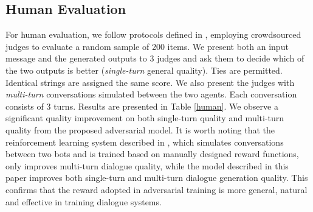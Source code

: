 \documentclass[11pt]{article}
\newcommand{\sts}{{{\textsc{Seq2Seq}}}\xspace}
\begin{document}
\begin{comment}
\subsection{N-choose-1 Metric}
We evaluate the model using an N-choose-1 ranking metric, as described in \newcite{shao15}. 
 In
the N-choose-1 evaluation, given dialogue history, we ask the generator to score N candidate responses, where one of the N candidate responses is the ground truth and the rest are random responses.
N-choose-1 accuracy is defined to be the fraction of test cases in which the trained model assigns the highest score to the ground truth.
We report 50-, 10-, and 2-choose-1 accuracy. Results are shown in Table \ref{choose}. 
Again we see a clear performance boost from the adversarial model over the
standard \sts variants.

\begin{table}
\small
\centering
\begin{tabular}{cccc}
\hline
Model&50&10&2\\\hline
\sts&0.087&0.28&0.73 \\
MMI&0.43&0.69&0.88\\
Adversarial&0.53&0.75&0.95\\\hline
\end{tabular}
\caption{N-choose-1 evaluation on different models.}
\label{choose}
\end{table}
\end{comment}

\subsection{Human Evaluation}
For human evaluation, we follow protocols defined in , employing
crowdsourced judges to evaluate a random sample of
200 items. We present both an input message and the
generated outputs to 3 judges and ask them to decide
which of the two outputs is better ({\it single-turn}
general quality). Ties are permitted. Identical
strings are assigned the same score. 
We also
 present the judges with {\it multi-turn}
conversations simulated between the two agents. Each conversation
consists of 3 turns.
Results are presented in Table \ref{human}.
We observe a significant quality improvement on both 
single-turn quality and multi-turn quality from the proposed adversarial model.
It is worth noting that the reinforcement learning system described in , which 
simulates conversations between two bots and 
is trained based on manually designed reward functions, only improves multi-turn dialogue quality, while the model described in this paper improves both single-turn and multi-turn dialogue generation quality. 
This confirms that the reward adopted in adversarial training is more general, natural and effective in training dialogue systems.
\end{document}
